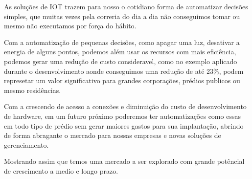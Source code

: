 \documentclass[openright]{normas-utf-tex} %
\begin{document}
As soluções de IOT trazem para nosso o cotidiano forma de automatizar decisões simples, que muitas vezes pela correria do dia a dia não conseguimos tomar ou mesmo não executamos por força do hábito. 

Com a automatização de pequenas decisões, como apagar uma luz, desativar a energia de alguns pontos, podemos além usar os recursos com mais eficiência, podemos gerar uma redução de custo consideravel, como no exemplo aplicado durante o desenvolvimento aonde conseguimos uma redução de até 23\%, podem represetar um valor significativo para grandes corporações, prédios publicos ou mesmo residências.

Com a crescendo de acesso a conexões e diminuição do custo de desenvolvimento de hardware, em um futuro próximo poderemos ter automatizações como essas em todo tipo de prédio sem gerar maiores gastos para sua implantação, abrindo de forma abragante o mercado para nossas empresas e novas soluções de gerenciamento.

Mostrando assim que temos uma mercado a ser explorado com grande potêncial de crescimento a medio e longo prazo.

\label{bibstart}
\label{bibend}

%
%
%
%
\end{document}
